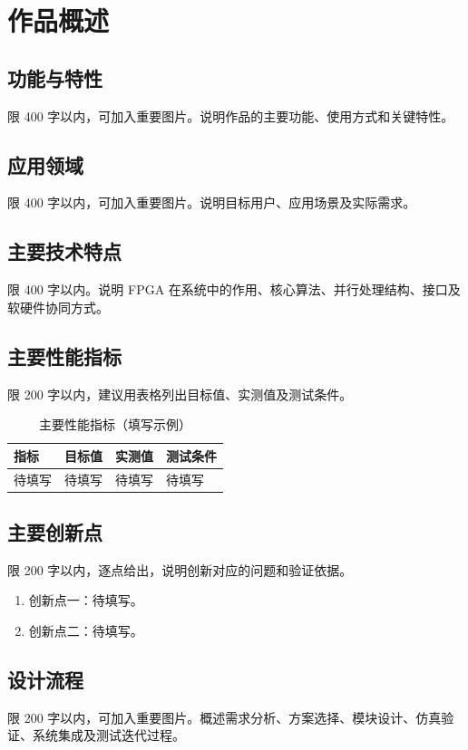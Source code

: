 ﻿\chapter{作品概述}
\section{功能与特性}
限 400 字以内，可加入重要图片。说明作品的主要功能、使用方式和关键特性。
\section{应用领域}
限 400 字以内，可加入重要图片。说明目标用户、应用场景及实际需求。
\section{主要技术特点}
限 400 字以内。说明 FPGA 在系统中的作用、核心算法、并行处理结构、接口及软硬件协同方式。
\section{主要性能指标}
限 200 字以内，建议用表格列出目标值、实测值及测试条件。
\begin{table}[htbp]
\centering
\caption{主要性能指标（填写示例）}
\label{tab:performance}
\begin{tabularx}{\textwidth}{XXXX}
\toprule
指标 & 目标值 & 实测值 & 测试条件 \\
\midrule
待填写 & 待填写 & 待填写 & 待填写 \\
\bottomrule
\end{tabularx}
\end{table}
\section{主要创新点}
限 200 字以内，逐点给出，说明创新对应的问题和验证依据。
\begin{enumerate}
\item 创新点一：待填写。
\item 创新点二：待填写。
\end{enumerate}
\section{设计流程}
限 200 字以内，可加入重要图片。概述需求分析、方案选择、模块设计、仿真验证、系统集成及测试迭代过程。
